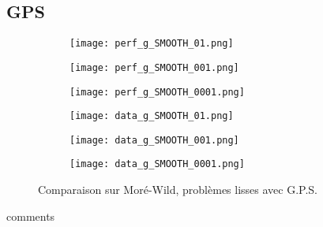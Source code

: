 \documentclass[letterpaper]{scrartcl}
\begin{document}
	\subsection{GPS}
		\begin{figure}[!htb] %
	\begin{subfigure}{0.48\textwidth}
		\texttt{[image: perf\_g\_SMOOTH\_01.png]}
	\end{subfigure}\hspace*{\fill}
	\begin{subfigure}{0.48\textwidth}
		\texttt{[image: perf\_g\_SMOOTH\_001.png]}
	\end{subfigure}
	\medskip
	\begin{subfigure}{0.48\textwidth}
		\texttt{[image: perf\_g\_SMOOTH\_0001.png]}
	\end{subfigure}\hspace*{\fill}
	\begin{subfigure}{0.48\textwidth}
		\texttt{[image: data\_g\_SMOOTH\_01.png]}
	\end{subfigure}
	\medskip
	\begin{subfigure}{0.48\textwidth}
		\texttt{[image: data\_g\_SMOOTH\_001.png]}
	\end{subfigure}\hspace*{\fill}
	\begin{subfigure}{0.48\textwidth}
		\texttt{[image: data\_g\_SMOOTH\_0001.png]}
	\end{subfigure}
	\caption{Comparaison sur Moré-Wild, problèmes lisses avec G.P.S.} \label{fig:5}
\end{figure}
\clearpage
comments
\clearpage
\end{document}

